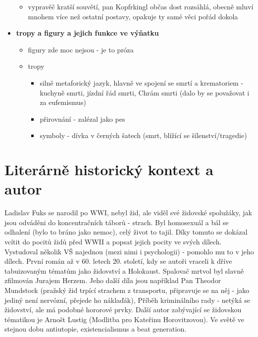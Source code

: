 \documentclass[11pt]{article}
\begin{document}
\begin{itemize}
\begin{itemize}
            \item vypravěč kratší souvětí, pan Kopfrkingl občas dost rozsáhlá, obecně mluví mnohem více než ostatní postavy, opakuje ty samé věci pořád dokola
        \end{itemize}
        \item\textbf{tropy a figury a jejich funkce ve výňatku}
        \begin{itemize}
            \item figury zde moc nejsou - je to próza
            \item tropy
            \begin{itemize}
                \item silně metaforický jazyk, hlavně ve spojení se smrtí a krematoriem - kuchyně smrti, jízdní řád smrti, Chrám smrti (dalo by se považovat i za eufemismus)
                \item přirovnání - zalézal jako pes
                \item symboly - dívka v černých šatech (smrt, blížící se šílenství/tragedie)
            \end{itemize}
        \end{itemize}
    \end{itemize}
    \section*{Literárně historický kontext a autor}
    Ladislav Fuks se narodil po WWI, nebyl žid, ale viděl své židovské spolužáky, jak jsou odváděni do koncentračních táborů - strach.
    Byl homosexuál a bál se odhalení (bylo to bráno jako nemoc), celý život to tajil. Díky tomuto se dokázal vcítit do pocitů židů před WWII a popsat jejich pocity ve svých dílech.
    Vystudoval několik VŠ najednou (mezi nimi i psychologii) - pomohlo mu to v jeho dílech. První román až v 60. letech 20. století, kdy se autoři vraceli k dříve tabuizovaným tématům jako židovství a Holokaust.
    Spalovač mrtvol byl slavně zfilmován Jurajem Herzem.
    Jeho další díla jsou například Pan Theodor Mundstock (pražský žid trpící strachem z transportu, připravuje se na něj - jako jediný není nervózní, přejede ho náklaďák), Příběh kriminálního rady - netýká se židovství, ale má podobné hororové prvky.
    Další autor zabývající se židovskou tématikou je Arnošt Lustig (Modlitba pro Kateřinu Horovitzovou).
    Ve světě ve stejnou dobu antiutopie, existencialismus a beat generation.
\end{document}

